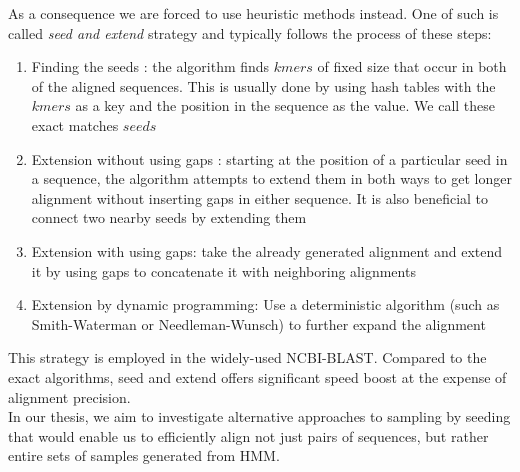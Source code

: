 As a consequence we are forced to use heuristic methods instead. One of such is called \emph{seed and extend} strategy and typically follows the process of these steps:
\begin{enumerate}
	\item{Finding the seeds : the algorithm finds $kmers$ of fixed size that occur in both of the aligned sequences. This is usually done by using hash tables with the $kmers$ as a key and the position in the sequence as the value. We call these exact matches $seeds$}
	\item{Extension without using gaps : starting at the position of a particular seed in a sequence, the algorithm attempts to extend them in both ways to get longer alignment without inserting gaps in either sequence. It is also beneficial to connect two nearby seeds by extending them}
	\item{Extension with using gaps: take the already generated alignment and extend it by using gaps to concatenate it with neighboring alignments}
	\item{Extension by dynamic programming: Use a deterministic algorithm (such as Smith-Waterman or Needleman-Wunsch) to further expand the alignment}
\end{enumerate}

This strategy is employed in the widely-used NCBI-BLAST. Compared to the exact algorithms, seed and extend offers significant speed boost at the expense of alignment precision.\\

In our thesis, we aim to investigate alternative approaches to sampling by seeding that would enable us to efficiently align not just pairs of sequences, but rather entire sets of samples generated from HMM.
